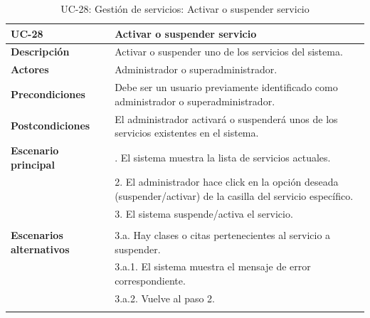 \begin{table}[H]
  \begin{center}
    \begin{tabularx}{16.4cm}{|l|X|}
      \hline
      \textbf{UC-28} & \textbf{Activar o suspender servicio}\\
      \hline
      \textbf{Descripción} & Activar o suspender uno de los servicios del sistema.\\
      \hline
      \textbf{Actores} & Administrador o superadministrador.\\
      \hline
      \textbf{Precondiciones} & Debe ser un usuario previamente identificado como administrador o superadministrador.\\
      \hline
      \textbf{Postcondiciones} & El administrador activará o suspenderá unos de los servicios existentes en el sistema.\\
      \hline
      \textbf{Escenario principal} & \smallskip 1. El sistema muestra la lista de servicios actuales.\\
      & 2. El administrador hace click en la opción deseada (suspender/activar) de la casilla del servicio específico.\\
      & 3. El sistema suspende/activa el servicio.\\
      & \\
      \hline
      \textbf{Escenarios alternativos} & \smallskip 3.a. Hay clases o citas pertenecientes al servicio a suspender.\\
      & \hspace{0.3cm} 3.a.1. El sistema muestra el mensaje de error correspondiente.\\
      & \hspace{0.3cm} 3.a.2. Vuelve al paso 2.\\      
      & \\
      \hline
    \end{tabularx}
    \caption{UC-28: Gestión de servicios: Activar o suspender servicio}
    \label{tab:CU-activar-suspender-servicio}
  \end{center}
\end{table}


